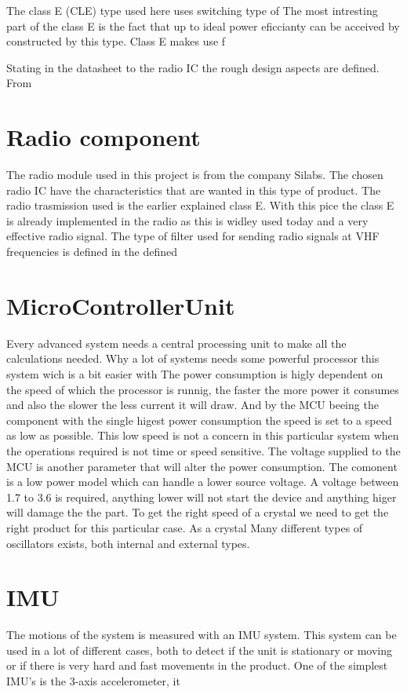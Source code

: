 \cite{class_e_new}
The class E (CLE) type used here uses switching type of 
The most intresting part of the class E is the fact that up to ideal power eficcianty can be acceived by constructed by this type. Class E makes use f

Stating in the datasheet to the radio IC the rough design aspects are defined. From

\section{Radio component}
 The radio module used in this project is from the company Silabs. The chosen radio IC have the characteristics that are wanted in this type of product. The radio trasmission used is the earlier explained class E. With this pice the class E is already implemented in the radio as this is widley used today and a very effective radio signal. 
The type of filter used for sending radio signals at VHF frequencies is defined in the defined 

\section{MicroControllerUnit}
Every advanced system needs a central processing unit to make all the calculations needed. Why a lot of systems needs some powerful processor this system wich is a bit easier with 
The power consumption is higly dependent on the speed of which the processor is runnig, the faster the more power it consumes and also the slower the less current it will draw. And by the MCU beeing the component with the single higest power consumption the speed is set to a speed as low as possible. This low speed is not a concern in this particular system when the operations required is not time or speed sensitive. The voltage supplied to the MCU is another parameter that will alter the power consumption. The comonent is a low power model which can handle a lower source voltage. A voltage between 1.7 to 3.6 is required, anything lower will not start the device and anything higer will damage the the part. 
To get the right speed of a crystal we need to get the right product for this particular case. As a crystal 
Many different types of oscillators exists, both internal and external types. 

\section{IMU}
The motions of the system is measured with an IMU system. This system can be used in a lot of different cases, both to detect if the unit is stationary or moving or if there is very hard and fast movements in the product. One of the simplest IMU's is the 3-axis accelerometer, it

